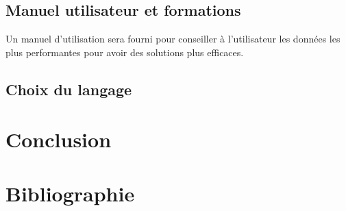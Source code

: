 \documentclass[a4paper,11pt]{article}
\begin{document}
		\subsection{Manuel utilisateur et formations}
		Un manuel d'utilisation sera fourni pour conseiller à l’utilisateur les données les plus performantes pour avoir des solutions plus efficaces.
	
    	\subsection{Choix du langage}
	
	\section*{Conclusion}
	
	\section*{Bibliographie}
	
\end{document}
